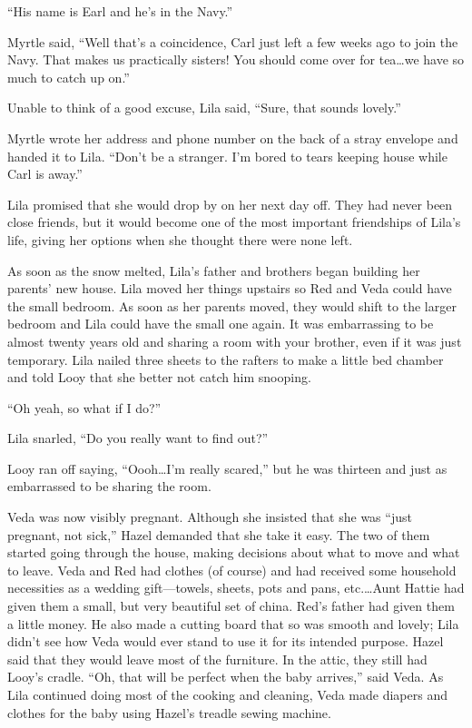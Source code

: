 \documentclass[
  letterpaper,
]{book}
\begin{document}
``His name is Earl and he's in the Navy.''

Myrtle said, ``Well that's a coincidence, Carl just left a few weeks ago
to join the Navy. That makes us practically sisters! You should come
over for tea\ldots we have so much to catch up on.''

Unable to think of a good excuse, Lila said, ``Sure, that sounds
lovely.''

Myrtle wrote her address and phone number on the back of a stray
envelope and handed it to Lila. ``Don't be a stranger. I'm bored to
tears keeping house while Carl is away.''

Lila promised that she would drop by on her next day off. They had never
been close friends, but it would become one of the most important
friendships of Lila's life, giving her options when she thought there
were none left.

As soon as the snow melted, Lila's father and brothers began building
her parents' new house. Lila moved her things upstairs so Red and Veda
could have the small bedroom. As soon as her parents moved, they would
shift to the larger bedroom and Lila could have the small one again. It
was embarrassing to be almost twenty years old and sharing a room with
your brother, even if it was just temporary. Lila nailed three sheets to
the rafters to make a little bed chamber and told Looy that she better
not catch him snooping.

``Oh yeah, so what if I do?''

Lila snarled, ``Do you really want to find out?''

Looy ran off saying, ``Oooh\ldots I'm really scared,'' but he was
thirteen and just as embarrassed to be sharing the room.

Veda was now visibly pregnant. Although she insisted that she was ``just
pregnant, not sick,'' Hazel demanded that she take it easy. The two of
them started going through the house, making decisions about what to
move and what to leave. Veda and Red had clothes (of course) and had
received some household necessities as a wedding gift---towels, sheets,
pots and pans, etc.\ldots Aunt Hattie had given them a small, but very
beautiful set of china. Red's father had given them a little money. He
also made a cutting board that so was smooth and lovely; Lila didn't see
how Veda would ever stand to use it for its intended purpose. Hazel said
that they would leave most of the furniture. In the attic, they still
had Looy's cradle. ``Oh, that will be perfect when the baby arrives,''
said Veda. As Lila continued doing most of the cooking and cleaning,
Veda made diapers and clothes for the baby using Hazel's treadle sewing
machine.
\end{document}
